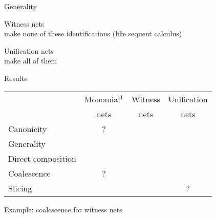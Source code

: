 \documentclass[xcolor=dvipsnames,9pt]{beamer}
\makeatletter
\newcommand\+{+}
\renewcommand\*{\times}
\newcommand\dual[1]{\overline{#1}}
\newcommand\seq[2]{{\vdash\,}#1,#2}
\newcommand\xmark{{\color{darkred}\ding{55}}}
\newcommand\vmark{{\color{darkgreen}\ding{51}}}
\newcommand\Qrr{\!\!\scriptstyle\qrr}
\newcommand\qrr[1]{
  \ifx#1+\expandafter\@qrr\else
  \ifx#1*\*\mathrm R\else
  \ifx#1!\forall\mathrm R\else
  \ifx#1?\expandafter\@@qrr\else
  \ifx#11\mathrm{ax}\else
  \ifx#1.\mathrm{cut}\else
  #1\mathrm R
  \fi\fi\fi\fi\fi\fi
}
\newcommand\@qrr[1]{+\mathrm R,#1}
\newcommand\@@qrr[1]{\exists\mathrm R,#1}
\newcommand\xs{(x,\!s)}
\newcommand\xt{(x,\!t)}
\newcommand\xy{(x,\!y)}
\newcommand\zs{(z,\!s)}
\newcommand\zt{(z,\!t)}
\makeatother
\begin{document}
\begin{frame}{Generality}

{\color{darkred}Witness nets} 
\\
make none of these identifications (like {\color{darkred}sequent calculus})

\bigskip
\bigskip

{\color{darkred}Unification nets}
\\
make all of them

\end{frame}
\begin{frame}{Results}

\begin{tabular}{@{}l@{}ccc@{}}
  &	Monomial$^1$ & Witness & Unification
\\ & nets & nets & nets
\\\hline
   Canonicity          &    ?   & \vmark & \vmark
\\ Generality          & \xmark & \xmark & \vmark
\\ Direct composition  & \xmark & \vmark & \vmark
\\ Coalescence         &    ?   & \vmark & \vmark
\\ Slicing             & \vmark & \vmark &   ?
\end{tabular}  


\end{frame}
\begin{frame}

\begin{center}
Example: coalescence for witness nets
\end{center}

\end{frame}
\end{document}
